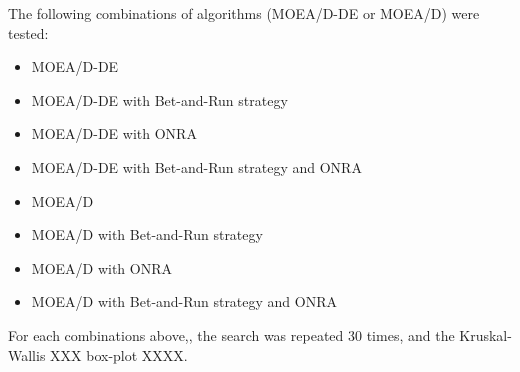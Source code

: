 The following combinations of algorithms (MOEA/D-DE or MOEA/D) were tested:

\begin{itemize}
	\item MOEA/D-DE
	\item MOEA/D-DE with Bet-and-Run strategy
	\item MOEA/D-DE with ONRA
	\item MOEA/D-DE with Bet-and-Run strategy and ONRA
	\item MOEA/D
	\item MOEA/D with Bet-and-Run strategy
	\item MOEA/D with ONRA
	\item MOEA/D with Bet-and-Run strategy and ONRA
\end{itemize}

For each combinations above,, the search was repeated 30 times, and the Kruskal-Wallis XXX box-plot XXXX.
%
%
%
%
%
%
%
%
%
%
%
%
%
%
